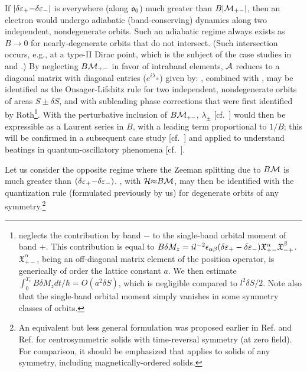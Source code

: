 \documentclass[aps, showpacs, twocolumn, notitlepage, superscriptaddress]{revtex4-1}
\begin{document}
 If $|\delta \varepsilon_+{-}\delta \varepsilon_-|$ is everywhere (along $\mathfrak{o}_0$) much greater than $B|{\cal M}_{+-}|$, then an electron would undergo adiabatic (band-conserving) dynamics\cite{nenciu_review} along two independent, nondegenerate orbits. Such an adiabatic regime always exists as $B{\rightarrow} 0$ for nearly-degenerate orbits that do not intersect. (Such intersection occurs, e.g., at a type-II Dirac point, which is the subject of the case studies in  and .)
By  neglecting  $B{\cal M}_{+-}$ in favor of intraband elements,  ${\cal A}$ reduces to a diagonal matrix with  diagonal entries ($e^{i\lambda_{\pm}}$) given by:
, combined with , may be identified as the Onsager-Lifshitz rule\cite{Onsager,lifshitz_kosevich,lifshitz_kosevich_jetp} for two independent, nondegenerate orbits of areas $S{\pm}\delta S$, and with subleading phase corrections that were first identified by Roth\cite{rothmag}\footnote{ neglects the contribution by band $-$ to the single-band orbital moment\cite{chang_berry_1996} of band $+$. This contribution is equal to $B\delta M_z=il^{-2}\epsilon_{\alpha\beta}(\delta \varepsilon_+-\delta \varepsilon_-)\mathfrak{X}^{\alpha}_{+-}\mathfrak{X}^{\beta}_{-+}$. $\mathfrak{X}^{\alpha}_{+-}$, being an off-diagonal matrix element of the position operator, is generically of order the lattice constant $a$. We then estimate $\int_0^{T_c} B\delta M_z dt/\hbar=O(a^2 \delta S)$, which is negligible compared to $l^2\delta S/2$. Note also that the single-band orbital moment simply vanishes in some symmetry classes of orbits\cite{100p}.}. With the perturbative inclusion of $B{\cal M}_{\scriptscriptstyle{+-}}$, $\lambda_{\pm}$ [cf.\ ] would then be expressible as a Laurent series in $B$, with a leading term proportional to $1/B$; this will be confirmed in a subsequent case study [cf.\ ] and applied to understand beatings in quantum-oscillatory phenomena [cf.\ ].

 Let us consider the opposite regime where the Zeeman splitting due to $B{\cal M}$ is much greater than $(\delta \varepsilon_+{-}\delta\varepsilon_-)$. , with ${\cal H}{\approx}B{\cal M}$, may then be identified with the quantization rule (formulated previously by us\cite{topoferm,100p}) for degenerate orbits of any symmetry.\footnote{An equivalent but less general formulation was proposed earlier in Ref.  and Ref.  for centrosymmetric solids with time-reversal symmetry (at zero field). For comparison, it should be emphasized that  applies to solids of any symmetry, including magnetically-ordered solids.}
\end{document}
